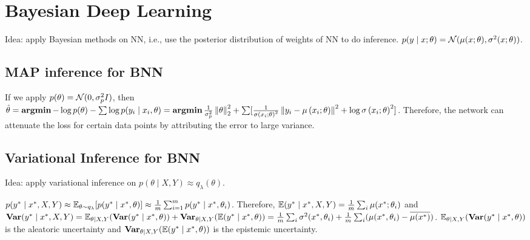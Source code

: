 \section{Bayesian Deep Learning}

Idea: apply Bayesian methods on NN, i.e., use the posterior distribution of weights of NN to do inference. $p(y\mid x;\theta) = \mathcal{N}(\mu(x;\theta), \sigma^2(x;\theta))$.

\subsection{MAP inference for BNN}

If we apply $p(\theta)=\mathcal{N}(0,\sigma_p^2 I)$, then $\hat{\theta} = \operatorname{\textbf{argmin}} -\log p(\theta) - \sum \log p(y_i\mid x_i,\theta) = \operatorname{\textbf{argmin}} \frac{1}{\sigma_p^2}\left\lVert\theta\right\rVert_2^2 + \sum [\frac{1}{\sigma\left(x_{i} ; \theta\right)^{2}}\left\|y_{i}-\mu\left(x_{i} ; \theta\right)\right\|^{2}+\log \sigma\left(x_{i} ; \theta\right)^{2}]$. Therefore, the network can attenuate the loss for certain data points by attributing the error to large variance.

\subsection{Variational Inference for BNN}

Idea: apply variational inference on $p(\theta\mid X,Y)\approx q_\lambda(\theta)$.

$p(y^*\mid x^*, X,Y)\approx \mathbb{E}_{\theta\sim q_\lambda}[p(y^*\mid x^*,\theta)]\approx \frac{1}{m}\sum_{i=1}^m p(y^*\mid x^*,\theta_i)$. Therefore, $\mathbb{E}(y^*\mid x^*, X,Y) = \frac{1}{m}\sum_i \mu(x^*; \theta_i)$ and $\operatorname{\textbf{Var}}(y^*\mid x^*,X,Y) = \mathbb{E}_{\theta\mid X,Y}(\operatorname{\textbf{Var}}(y^*\mid x^*,\theta))+\operatorname{\textbf{Var}}_{\theta\mid X,Y}(\mathbb{E}(y^*\mid x^*,\theta)) = \frac{1}{m}\sum_i \sigma^2(x^*, \theta_i)+\frac{1}{m}\sum_i(\mu(x^*,\theta_i)-\overline{\mu(x^*)})$. $\mathbb{E}_{\theta\mid X,Y}(\operatorname{\textbf{Var}}(y^*\mid x^*,\theta))$ is the aleatoric uncertainty and $\operatorname{\textbf{Var}}_{\theta\mid X,Y}(\mathbb{E}(y^*\mid x^*,\theta))$ is the epistemic uncertainty.